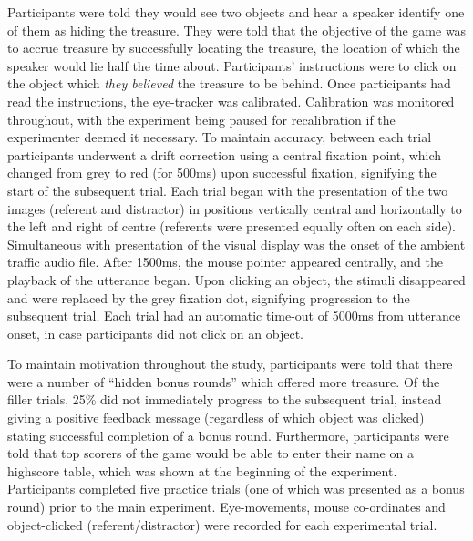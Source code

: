 \documentclass[a4paper,man,natbib]{apa6}
\begin{document}
Participants were told they would see two objects and hear a speaker identify one of them as hiding the treasure. 
They were told that the objective of the game was to accrue treasure by successfully locating the treasure, the location of which the speaker would lie half the time about. Participants' instructions were to click on the object which \textit{they believed} the treasure to be behind. 
Once participants had read the instructions, the eye-tracker was calibrated.
Calibration was monitored throughout, with the experiment being paused for recalibration if the experimenter deemed it necessary.
To maintain accuracy, between each trial participants underwent a drift correction using a central fixation point, which changed from grey to red (for 500ms) upon successful fixation, signifying the start of the subsequent trial. 
Each trial began with the presentation of the two images (referent and distractor) in positions vertically central and horizontally to the left and right of centre (referents were presented equally often on each side). 
Simultaneous with presentation of the visual display was the onset of the ambient traffic audio file. 
After 1500ms, the mouse pointer appeared centrally, and the playback of the utterance began. 
Upon clicking an object, the stimuli disappeared and were replaced by the grey fixation dot, signifying progression to the subsequent trial. 
Each trial had an automatic time-out of 5000ms from utterance onset, in case participants did not click on an object.


To maintain motivation throughout the study, participants were told that there were a number of ``hidden bonus rounds'' which offered more treasure. 
Of the filler trials, 25\% did not immediately progress to the subsequent trial, instead giving a positive feedback message (regardless of which object was clicked) stating successful completion of a bonus round. 
Furthermore, participants were told that top scorers of the game would be able to enter their name on a highscore table, which was shown at the beginning of the experiment. 
Participants completed five practice trials (one of which was presented as a bonus round) prior to the main experiment. 
Eye-movements, mouse co-ordinates and object-clicked (referent/distractor) were recorded for each experimental trial.
\end{document}
